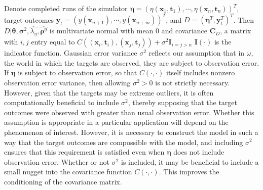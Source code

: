\documentclass[twocolumn,10pt]{asme2ej}
\begin{document}

%
Denote completed runs of the simulator $\boldsymbol \eta = (\eta(\mathbf x_1,\mathbf t_1),\cdots,\eta(\mathbf x_n,\mathbf t_n))^T$, target outcomes $\mathbf y_t = (y(\mathbf x_{n+1}),\cdots,y(\mathbf x_{n+m}))^T$, 
and $D = (\boldsymbol \eta^T,\mathbf y_t^T)^T$.
%
Then $D | \boldsymbol \theta,\boldsymbol\sigma^2,\widehat{\lambda_\eta}, \widehat{\boldsymbol \rho^\eta}$ is multivariate normal with mean 0 and covariance $\mathbf C_D$, a matrix with $i,j$ entry equal to 
$
C((\mathbf x_i,\mathbf t_i),(\mathbf x_j,\mathbf t_j)) + 
\sigma^2 \mathbf I_{i=j>n}
$
%
$\mathbf I(\cdot)$ is the indicator function. 
%
Gaussian error variance $\sigma^2$ reflects our assumption that in $\omega$, the world in which the targets are observed, they are subject to observation error.
%
If $\boldsymbol\eta$ is subject to observation error, so that $C(\cdot,\cdot)$ itself includes nonzero observation error variance, then allowing $\sigma^2>0$ is not strictly necessary.
%
However, given that the targets may be extreme outliers, it is often computationally beneficial to include $\sigma^2$, thereby supposing that the target outcomes were observed with greater than usual observation error.
%
Whether this assumption is appropriate in a particular application will depend on the phenomenon of interest.
%
However, it is necessary to construct the model in such a way that the target outcomes are compossible with the model, and including $\sigma^2$ ensures that this requirement is satisfied even when $\boldsymbol\eta$ does not include observation error.
%
Whether or not $\sigma^2$ is included, it may be beneficial to include a small nugget into the covariance function $C(\cdot,\cdot)$.
%
This improves the conditioning of the covariance matrix. %
%
\end{document}
